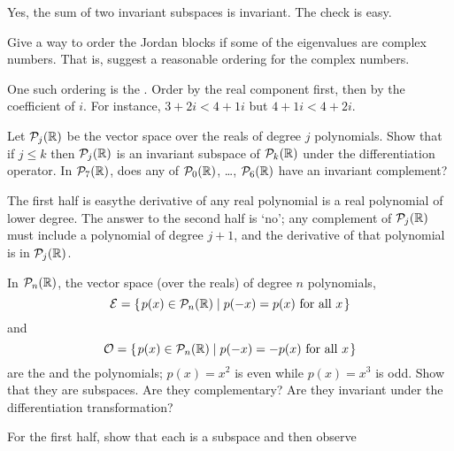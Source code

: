 \begin{exercises}
\begin{answer}
      Yes, the sum of two invariant subspaces is invariant.
      The check is easy.  
    \end{answer}
  \item  \label{exer:OrderC}
     Give a way to order the Jordan blocks if some of the eigenvalues
     are complex numbers.
     That is, suggest a reasonable ordering for the complex numbers.
     \begin{answer}
       One such ordering is the .
       Order by the real component first, then by the coefficient of \( i \).
       For instance, \( 3+2i<4+1i \) but \( 4+1i<4+2i \).  
     \end{answer}
  \item
    Let \( \mathcal{P}_j(\mathbb{R}) \) be the vector space over
    the reals of degree \( j \) polynomials.
    Show that if \( j\le k \) then \( \mathcal{P}_j(\mathbb{R}) \) is an invariant
    subspace of \( \mathcal{P}_k(\mathbb{R}) \) under the differentiation operator.
    In \( \mathcal{P}_7(\mathbb{R}) \), does any of \( \mathcal{P}_0(\mathbb{R}) \),
    \ldots, \( \mathcal{P}_6(\mathbb{R}) \) have an invariant complement?
    \begin{answer}
     The first half is easy\Dash the derivative of any real polynomial is
      a real polynomial of lower degree.
      The answer to the second half is `no'; any complement of
      \( \mathcal{P}_j(\mathbb{R}) \) must include a polynomial of degree \( j+1 \),
      and the derivative of that polynomial is in \( \mathcal{P}_j(\mathbb{R})\).  
     \end{answer}
  \item
    In \( \mathcal{P}_n(\mathbb{R}) \), the vector space (over the
    reals) of degree \( n \) polynomials,
    \begin{equation*}
      \mathcal{E}=
      \set{p(x)\in\polyspace_n(\Re)\suchthat p(-x)=p(x) \text{\ for all\ }x}
    \end{equation*}
    and
    \begin{equation*}
      \mathcal{O}=
      \mbox{$\{\hspace{0.1em}p(x)\in\mathcal{P}_n(\mathbb{R})\mid p(-x)=-p(x) \text{\ for all\ }x\hspace{0.1em}\}$}
    \end{equation*}
    are the  
    and the 
     polynomials; \( p(x)=x^2 \) is
    even while \( p(x)=x^3 \) is odd.
    Show that they are subspaces.
    Are they complementary?
    Are they invariant under the differentiation transformation?
    \begin{answer}
      For the first half, show that each is a subspace and then observe

\end{answer}
\end{exercises}
